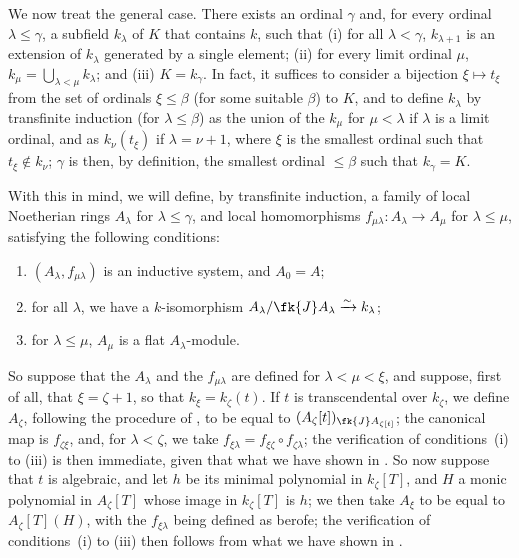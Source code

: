 \begin{env}[10.3.1.4]
\label{0.10.3.1.4}
We now treat the general case.
There exists an ordinal $\gamma$ and, for every ordinal $\lambda\leq\gamma$, a subfield $k_\lambda$ of $K$ that contains $k$, such that (i) for all $\lambda<\gamma$, $k_{\lambda+1}$ is an extension of $k_\lambda$ generated by a single element; (ii) for every limit ordinal $\mu$, $k_\mu=\bigcup_{\lambda<\mu}k_\lambda$; and (iii) $K=k_\gamma$.
In fact, it suffices to consider a bijection $\xi\mapsto t_\xi$ from the set of ordinals $\xi\leq\beta$ (for some suitable $\beta$) to $K$, and to define $k_\lambda$ by transfinite induction (for $\lambda\leq\beta$) as the union of the $k_\mu$ for $\mu<\lambda$ if $\lambda$ is a limit ordinal, and as $k_\nu(t_\xi)$ if $\lambda=\nu+1$, where $\xi$ is the smallest ordinal such that $t_\xi\not\in k_\nu$;
$\gamma$ is then, by definition, the smallest ordinal $\leq\beta$ such that $k_\gamma=K$.

With this in mind, we will define, by transfinite induction, a family of local Noetherian rings $A_\lambda$ for $\lambda\leq\gamma$, and local homomorphisms $f_{\mu\lambda}:A_\lambda\to A_\mu$ for $\lambda\leq\mu$, satisfying the following conditions:
\begin{enumerate}[label=\emph{(\roman*)}]
    \item $(A_\lambda,f_{\mu\lambda})$ is an inductive system, and $A_0=A$;
    \item for all $\lambda$, we have a $k$-isomorphism $A_\lambda/\fk{J}A_\lambda\xrightarrow{\sim}k_\lambda$;
    \item for $\lambda\leq\mu$, $A_\mu$ is a flat $A_\lambda$-module.
\end{enumerate}

So suppose that the $A_\lambda$ and the $f_{\mu\lambda}$ are defined for $\lambda<\mu<\xi$, and suppose, first of all, that $\xi=\zeta+1$, so that $k_\xi=k_\zeta(t)$.
If $t$ is transcendental over $k_\zeta$, we define $A_\zeta$, following the procedure of , to be equal to $(A_\zeta[t])_{\fk{J}A_{\zeta[t]}}$;
the canonical map is $f_{\zeta\xi}$, and, for $\lambda<\zeta$, we take $f_{\xi\lambda}=f_{\xi\zeta}\circ f_{\zeta\lambda}$;
the verification of conditions~(i) to (iii) is then immediate, given that what we have shown in .
So now suppose that $t$ is algebraic, and let $h$ be its minimal polynomial in $k_\zeta[T]$, and $H$ a monic polynomial in $A_\zeta[T]$ whose image in $k_\zeta[T]$ is $h$;
we then take $A_\xi$ to be equal to $A_\zeta[T](H)$, with the $f_{\xi\lambda}$ being defined as berofe;
the verification of conditions~(i) to (iii) then follows from what we have shown in .


\end{env}
